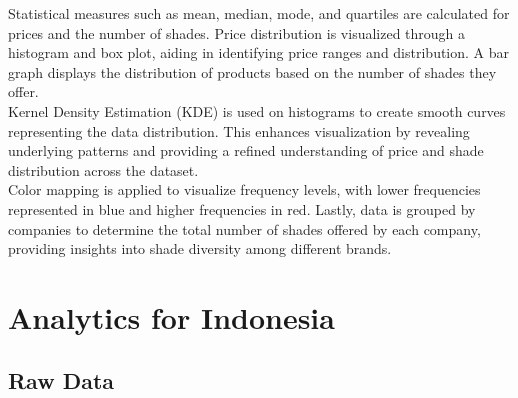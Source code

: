 \documentclass{article}
\begin{document}
\noindent Statistical measures such as mean, median, mode, and quartiles are calculated for prices and the number of shades. Price distribution is visualized through a histogram and box plot, aiding in identifying price ranges and distribution. A bar graph displays the distribution of products based on the number of shades they offer. \\

\noindent Kernel Density Estimation (KDE) is used on histograms to create smooth curves representing the data distribution. This enhances visualization by revealing underlying patterns and providing a refined understanding of price and shade distribution across the dataset. \\

\noindent Color mapping is applied to visualize frequency levels, with lower frequencies represented in blue and higher frequencies in red. Lastly, data is grouped by companies to determine the total number of shades offered by each company, providing insights into shade diversity among different brands.

\section{Analytics for Indonesia}
\subsection{Raw Data}
\end{document}

